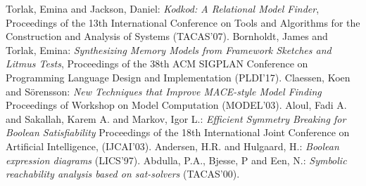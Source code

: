 \documentclass{article}
\theoremstyle{definition}
\begin{document}
    \begin{thebibliography}{999}
          Torlak, Emina and Jackson, Daniel:
          \emph{Kodkod: A Relational Model Finder},
          Proceedings of the 13th International Conference on Tools and Algorithms for the Construction and Analysis of Systems (TACAS'07).
          Bornholdt, James and Torlak, Emina:
          \emph{Synthesizing Memory Models from Framework Sketches and Litmus Tests},
          Proceedings of the 38th ACM SIGPLAN Conference on Programming Language Design and Implementation (PLDI'17).
          Claessen, Koen and S{\"o}rensson:
          \emph{New Techniques that Improve {MACE}-style Model Finding}
          Proceedings of Workshop on Model Computation (MODEL'03).
          Aloul, Fadi A. and Sakallah, Karem A. and Markov, Igor L.:
          \emph{Efficient Symmetry Breaking for Boolean Satisfiability}
          Proceedings of the 18th International Joint Conference on Artificial Intelligence, (IJCAI'03).
          Andersen, H.R. and Hulgaard, H.:
          \emph{Boolean expression diagrams}
          (LICS'97).
          Abdulla, P.A., Bjesse, P and Een, N.:
          \emph{Symbolic reachability analysis based on sat-solvers}
          (TACAS'00).
      \end{thebibliography}
  
\end{document}
